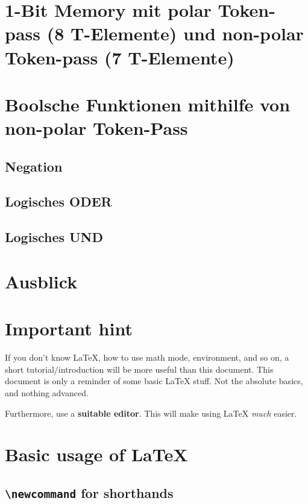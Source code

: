 \documentclass[11pt]{scrartcl}
\theoremstyle{plain} %
\theoremstyle{definition} %
\theoremstyle{remark} %
\begin{document}
\section{1-Bit Memory mit polar Token-pass (8 T-Elemente) und non-polar Token-pass (7 T-Elemente)}


\section{Boolsche Funktionen mithilfe von non-polar Token-Pass}

\subsection{Negation}

\subsection{Logisches ODER}

\subsection{Logisches UND}

\section{Ausblick}




\section{Important hint}

If you don't know \LaTeX{}, how to use math mode, environment, and so on,
a short tutorial/introduction will be more useful than this document.
This document is only a reminder of some basic \LaTeX{} stuff.
Not the absolute basics, and nothing advanced.

Furthermore, use a \textbf{suitable editor}.
This will make using \LaTeX{} \emph{much} easier.

\section{Basic usage of \LaTeX}
\label{sec:math-and-env}


\subsection{{\texttt{\textbackslash{}newcommand} for shorthands}}
\label{subsec:newcommand}
\end{document}
